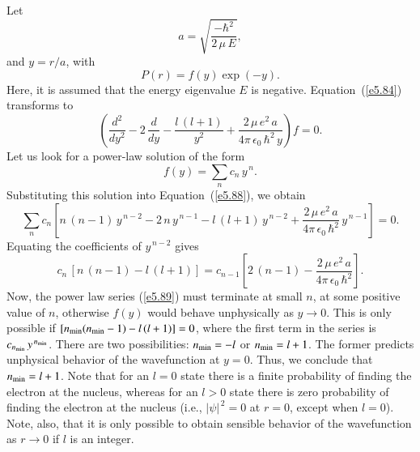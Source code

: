 Let 
\begin{equation}\label{e5.86}
a= \sqrt{\frac{-\hbar^2}{2\,\mu \,E}},
\end{equation}
and $y=r/a$, with
  \begin{equation}\label{e5.87}
P(r) = f(y) \exp(-y).
\end{equation}
Here, it is assumed that the energy eigenvalue $E$ is negative.
Equation~(\ref{e5.84}) transforms to 
\begin{equation}\label{e5.88}
\left(\frac{d^2}{dy^2} -2\,\frac{d}{dy} -\frac{l\,(l+1)}{y^2}
+ \frac{2\,\mu\, e^2\, a}{4\pi\, \epsilon_0\, \hbar^2\,y}\right) f= 0.
\end{equation}
Let us look for a power-law solution of the form
\begin{equation}\label{e5.89}
f(y) = \sum_{n} c_n\, y^{\,n}.
\end{equation}
Substituting this solution into Equation~(\ref{e5.88}), we obtain
\begin{equation}
\sum_n c_n \left[ n\,(n-1)\,y^{\,n-2} - 2\,n\, y^{\,n-1} - l\,(l+1) \,y^{\,n-2} +
\frac{2\,\mu\, e^2 \,a}{4\pi\, \epsilon_0 \,\hbar^2}\, y^{\,n-1} \right] = 0.
\end{equation}
Equating the coefficients of $y^{\,n-2}$ gives
\begin{equation}\label{e5.91}
c_n\,[n\,(n-1) - l\,(l+1)] = c_{n-1} \left [2\,(n-1) - \frac{2\,\mu\, e^2\, a}{4\pi\, \epsilon_0\, \hbar^2}\right].
\end{equation}
Now, the power law series (\ref{e5.89}) must terminate at small $n$, at some positive
value of $n$, otherwise $f(y)$ would behave unphysically as $y\rightarrow 0$. This
is only possible if $[n_{\rm min} (n_{\rm min} -1) - l\,(l+1) ] =0$, where
the first term in the series is $c_{n_{\rm min}}\,y^{\,n_{\rm min}}$. There
are two possibilities: $n_{\rm min} = -l$ or $n_{\rm min} = l+1$. The
former predicts  unphysical behavior of the wavefunction at $y=0$.
Thus, we conclude that $n_{\rm min} = l+1$. Note that for an $l=0$ state
there is a finite probability of finding the electron at the nucleus,
whereas for an $l>0$ state there is zero  probability of finding 
the electron at the nucleus ({\rm i.e.}, $|\psi|^{\,2} =0$ at $r=0$, except when
$l=0$). Note, also,  that it is only possible to obtain sensible behavior of the
wavefunction as $r\rightarrow 0$ if $l$ is an integer. 

